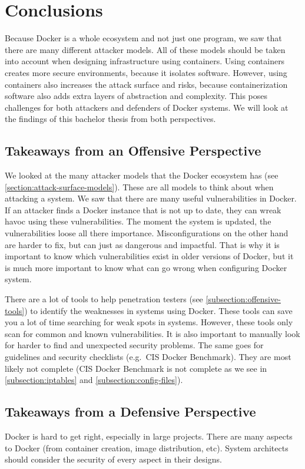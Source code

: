 \chapter{Conclusions}
Because Docker is a whole ecosystem and not just one program, we saw that there are many different attacker models. All of these models should be taken into account when designing infrastructure using containers. Using containers creates more secure environments, because it isolates software. However, using containers also increases the attack surface and risks, because containerization software also adds extra layers of abstraction and complexity. This poses challenges for both attackers and defenders of Docker systems. We will look at the findings of this bachelor thesis from both perspectives.

\section{Takeaways from an Offensive Perspective}
We looked at the many attacker models that the Docker ecosystem has (see \autoref{section:attack-surface-models}). These are all models to think about when attacking a system. We saw that there are many useful vulnerabilities in Docker. If an attacker finds a Docker instance that is not up to date, they can wreak havoc using these vulnerabilities. The moment the system is updated, the vulnerabilities loose all there importance. Misconfigurations on the other hand are harder to fix, but can just as dangerous and impactful. That is why it is important to know which vulnerabilities exist in older versions of Docker, but it is much more important to know what can go wrong when configuring Docker system.

\hfill

There are a lot of tools to help penetration testers (see \autoref{subsection:offensive-tools}) to identify the weaknesses in systems using Docker. These tools can save you a lot of time searching for weak spots in systems. However, these tools only scan for common and known vulnerabilities. It is also important to manually look for harder to find and unexpected security problems.
The same goes for guidelines and security checklists (e.g.\ CIS Docker Benchmark). They are most likely not complete (CIS Docker Benchmark is not complete as we see in \autoref{subsection:iptables} and \autoref{subsection:config-files}).

\section{Takeaways from a Defensive Perspective}
Docker is hard to get right, especially in large projects. There are many aspects to Docker (from container creation, image distribution, etc). System architects should consider the security of every aspect in their designs.


